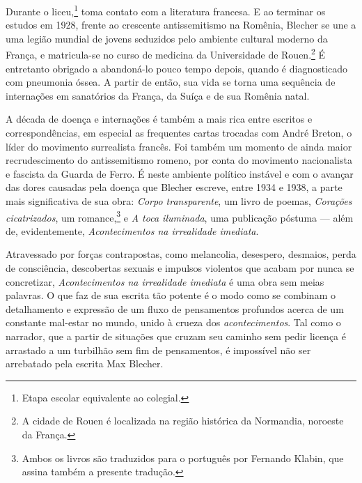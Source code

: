 Durante o liceu,\footnote{Etapa escolar equivalente ao colegial.} toma contato com a literatura francesa. E ao terminar os estudos em 1928, frente ao crescente antissemitismo na Romênia, Blecher se une a uma legião mundial de jovens seduzidos pelo ambiente cultural moderno da França, e matricula-se no curso de medicina da Universidade de Rouen.\footnote{A cidade de Rouen é localizada na região histórica da Normandia, noroeste da França.} É entretanto obrigado a abandoná-lo pouco tempo depois, quando é diagnosticado com pneumonia óssea. A partir de então, sua vida se torna uma sequência de internações em sanatórios da França, da Suíça e de sua Romênia natal.
	
A década de doença e internações é também a mais rica entre escritos e correspondências, em especial as frequentes cartas trocadas com André Breton, o líder do movimento surrealista francês. Foi também um momento de ainda maior recrudescimento do antissemitismo romeno, por conta do movimento nacionalista e fascista da Guarda de Ferro. É neste ambiente político instável e com o avançar das dores causadas pela doença que Blecher escreve, entre 1934 e 1938, a parte mais significativa de sua obra: \textit{Corpo transparente}, um livro de poemas, \textit{Corações cicatrizados}, um romance,\footnote{Ambos os livros são traduzidos para o português por Fernando Klabin, que assina também a presente tradução.} e \textit{A toca iluminada}, uma publicação póstuma --- além de, evidentemente, \textit{Acontecimentos na irrealidade imediata}.

Atravessado por forças contrapostas, como melancolia, desespero, desmaios, perda de consciência, descobertas sexuais e impulsos violentos que acabam por nunca se concretizar, \textit{Acontecimentos na irrealidade imediata} é uma obra sem meias palavras. O que faz de sua escrita tão potente é o modo como se combinam o detalhamento e expressão de um fluxo de pensamentos profundos acerca de um constante mal-estar no mundo, unido à crueza dos \textit{acontecimentos}. Tal como o narrador, que a partir de situações que cruzam seu caminho sem pedir licença é arrastado a um turbilhão sem fim de pensamentos, é impossível não ser arrebatado pela escrita Max Blecher.